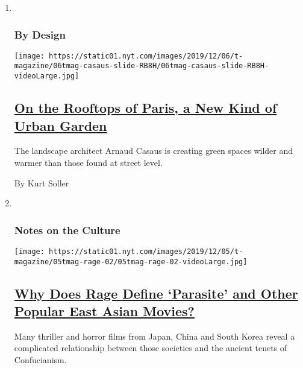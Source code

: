 \begin{enumerate}
\def\labelenumi{\arabic{enumi}.}
\item ~
  \hypertarget{by-design}{%
  \subsubsection{By Design}\label{by-design}}

  \texttt{[image: https://static01.nyt.com/images/2019/12/06/t-magazine/06tmag-casaus-slide-RB8H/06tmag-casaus-slide-RB8H-videoLarge.jpg]}

  \hypertarget{on-the-rooftops-of-paris-a-new-kind-of-urban-garden}{%
  \subsection{\texorpdfstring{\href{/2019/12/06/t-magazine/paris-rooftop-garden.html}{On
  the Rooftops of Paris, a New Kind of Urban
  Garden}}{On the Rooftops of Paris, a New Kind of Urban Garden}}\label{on-the-rooftops-of-paris-a-new-kind-of-urban-garden}}

  The landscape architect Arnaud Casaus is creating green spaces wilder
  and warmer than those found at street level.

  By Kurt Soller
\item ~
  \hypertarget{notes-on-the-culture}{%
  \subsubsection{Notes on the Culture}\label{notes-on-the-culture}}

  \texttt{[image: https://static01.nyt.com/images/2019/12/05/t-magazine/05tmag-rage-02/05tmag-rage-02-videoLarge.jpg]}

  \hypertarget{why-does-rage-define-parasite-and-other-popular-east-asian-movies}{%
  \subsection{\texorpdfstring{\href{/2019/11/25/t-magazine/asia-movies-parasite.html}{Why
  Does Rage Define `Parasite' and Other Popular East Asian
  Movies?}}{Why Does Rage Define `Parasite' and Other Popular East Asian Movies?}}\label{why-does-rage-define-parasite-and-other-popular-east-asian-movies}}

  Many thriller and horror films from Japan, China and South Korea
  reveal a complicated relationship between those societies and the
  ancient tenets of Confucianism.


\end{enumerate}
